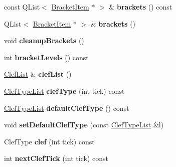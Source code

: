 \begin{DoxyCompactItemize}
\mbox{\label{class_ms_1_1_staff_a0ab58cc207efdeaedf1de006cd22d03d}} 
const Q\+List$<$ \hyperlink{class_ms_1_1_bracket_item}{Bracket\+Item} $\ast$ $>$ \& {\bfseries brackets} () const
\item 
\mbox{\label{class_ms_1_1_staff_aca7f5c2bd140b459507b384a20fae28a}} 
Q\+List$<$ \hyperlink{class_ms_1_1_bracket_item}{Bracket\+Item} $\ast$ $>$ \& {\bfseries brackets} ()
\item 
\mbox{\label{class_ms_1_1_staff_a48fdfe978931893fc1f4e730471c9a56}} 
void {\bfseries cleanup\+Brackets} ()
\item 
\mbox{\label{class_ms_1_1_staff_aeb4294a5e1de9d83d1ea27b1b6cd9b74}} 
int {\bfseries bracket\+Levels} () const
\item 
\mbox{\label{class_ms_1_1_staff_a9cf245a00fa95bd8edfdb9e9d8f7f3cc}} 
\hyperlink{class_ms_1_1_clef_list}{Clef\+List} \& {\bfseries clef\+List} ()
\item 
\mbox{\label{class_ms_1_1_staff_ac9da48ad6a1259a3230ef45f9080456d}} 
\hyperlink{struct_ms_1_1_clef_type_list}{Clef\+Type\+List} {\bfseries clef\+Type} (int tick) const
\item 
\mbox{\label{class_ms_1_1_staff_a944eccfefdde97d34f36dbb224160ee9}} 
\hyperlink{struct_ms_1_1_clef_type_list}{Clef\+Type\+List} {\bfseries default\+Clef\+Type} () const
\item 
\mbox{\label{class_ms_1_1_staff_ada653fb1907c64b648c4d5104dfc5154}} 
void {\bfseries set\+Default\+Clef\+Type} (const \hyperlink{struct_ms_1_1_clef_type_list}{Clef\+Type\+List} \&l)
\item 
\mbox{\label{class_ms_1_1_staff_ac574ca41ca733a9a02be5a853c96e2ee}} 
Clef\+Type {\bfseries clef} (int tick) const
\item 
\mbox{\label{class_ms_1_1_staff_a3aa961ef5ee088120992ebe16d9d1cc8}} 
int {\bfseries next\+Clef\+Tick} (int tick) const
\item 
\mbox{\label{class_ms_1_1_staff_a1cee4023c04857a5427c9ec874d12ac4}} 

\end{DoxyCompactItemize}
